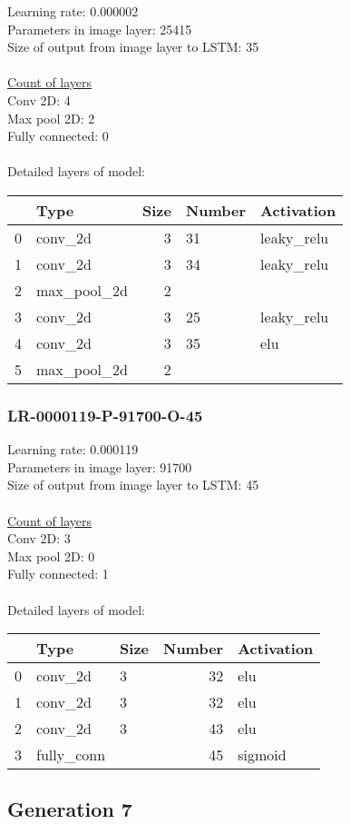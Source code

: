 Learning rate: 0.000002
\\Parameters in image layer: 25415
\\Size of output from image layer to LSTM: 35
\\\\\underline{Count of layers} 
\\Conv 2D:           4\\Max pool 2D:      2\\Fully connected:  0
\\\\Detailed layers of model: \\\begin{tabular}{rlrll}
\hline
    & Type        &   Size & Number   & Activation   \\
\hline
  0 & conv\_2d     &      3 & 31       & leaky\_relu   \\
  1 & conv\_2d     &      3 & 34       & leaky\_relu   \\
  2 & max\_pool\_2d &      2 &          &              \\
  3 & conv\_2d     &      3 & 25       & leaky\_relu   \\
  4 & conv\_2d     &      3 & 35       & elu          \\
  5 & max\_pool\_2d &      2 &          &              \\
\hline
\end{tabular}\subsubsection*{LR-0000119-P-91700-O-45}
Learning rate: 0.000119
\\Parameters in image layer: 91700
\\Size of output from image layer to LSTM: 45
\\\\\underline{Count of layers} 
\\Conv 2D:           3\\Max pool 2D:      0\\Fully connected:  1
\\\\Detailed layers of model: \\\begin{tabular}{rllrl}
\hline
    & Type       & Size   &   Number & Activation   \\
\hline
  0 & conv\_2d    & 3      &       32 & elu          \\
  1 & conv\_2d    & 3      &       32 & elu          \\
  2 & conv\_2d    & 3      &       43 & elu          \\
  3 & fully\_conn &        &       45 & sigmoid      \\
\hline
\end{tabular}\subsection{Generation 7}
